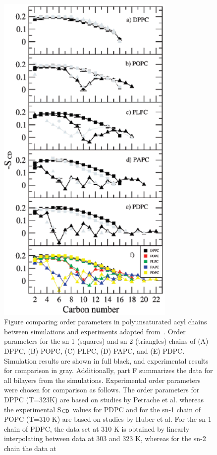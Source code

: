 \documentclass[aps,prl,superscriptaddress,twocolumn]{revtex4}
\begin{document}
\begin{figure}[]
  \includegraphics[width=8.6cm]{../Fig/polyunsat.eps}
\newline
  \caption{\label{polyunsat}
   Figure comparing order parameters in polyunsaturated acyl chains between simulations and 
   experiments adapted from~\cite{ollila07a}.
   Order parameters for the sn-1 (squares) and sn-2 (triangles)
   chains of (A) DPPC, (B) POPC, (C) PLPC, (D) PAPC, and (E) PDPC.
   Simulation results are shown in full black, and experimental results
   for comparison in gray. Additionally, part F summarizes the data for
   all bilayers from the simulations. Experimental order parameters were
   chosen for comparison as follows. The order parameters for DPPC (T=323K) 
   are based on studies by Petrache et al. \cite{petrache00} whereas the
   experimental S$_{{\rm CD}}$ values for PDPC and for the sn-1 chain of POPC (T=310 K) 
   are based on studies by Huber et al. \cite{huber02} For the sn-1 chain of
   PDPC, the data set at 310 K is obtained by linearly interpolating
   between data at 303 and 323 K, whereas for the sn-2 chain the data at
}
\end{figure}
\end{document}
